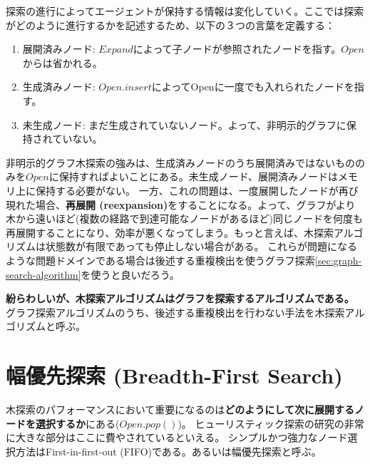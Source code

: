 \documentclass[10pt]{book}
\begin{document}
探索の進行によってエージェントが保持する情報は変化していく。ここでは探索がどのように進行するかを記述するため、以下の３つの言葉を定義する：

\begin{enumerate}
\item 展開済みノード: $Expand$によって子ノードが参照されたノードを指す。$Open$からは省かれる。
\item 生成済みノード: $Open.insert$によってOpenに一度でも入れられたノードを指す。
\item 未生成ノード: まだ生成されていないノード。よって、非明示的グラフに保持されていない。

\end{enumerate}

非明示的グラフ木探索の強みは、生成済みノードのうち展開済みではないもののみを$Open$に保持すればよいことにある。未生成ノード、展開済みノードはメモリ上に保持する必要がない。
一方、これの問題は、一度展開したノードが再び現れた場合、{\bf 再展開 (reexpansion)}をすることになる。よって、グラフがより木から遠いほど(複数の経路で到達可能なノードがあるほど)同じノードを何度も再展開することになり、効率が悪くなってしまう。もっと言えば、木探索アルゴリズムは状態数が有限であっても停止しない場合がある。
これらが問題になるような問題ドメインである場合は後述する重複検出を使うグラフ探索\ref{sec:graph-search-algorithm}を使うと良いだろう。

{\bf 紛らわしいが、木探索アルゴリズムはグラフを探索するアルゴリズムである。}
グラフ探索アルゴリズムのうち、後述する重複検出を行わない手法を木探索アルゴリズムと呼ぶ。








\section{幅優先探索 (Breadth-First Search)}
\label{sec:breadth-first-search}

木探索のパフォーマンスにおいて重要になるのは{\bf どのようにして次に展開するノードを選択するか}にある($Open.pop()$)。
ヒューリスティック探索の研究の非常に大きな部分はここに費やされているといえる。
シンプルかつ強力なノード選択方法はFirst-in-first-out (FIFO)である。あるいは幅優先探索と呼ぶ。
\end{document}
